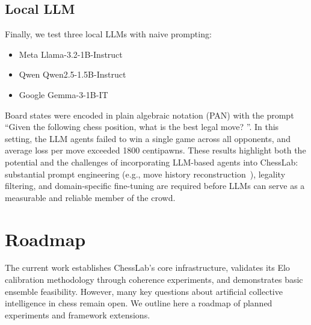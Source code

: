 \documentclass[sigconf]{aamas}
\begin{document}
\subsection{Local LLM}

Finally, we test three local LLMs with naive prompting:
\begin{itemize}
  \item Meta Llama-3.2-1B-Instruct
  \item Qwen Qwen2.5-1.5B-Instruct
  \item Google Gemma-3-1B-IT
\end{itemize}
Board states were encoded in plain algebraic notation (PAN) with the prompt ``Given the following chess position, what is the best legal move? ''.
In this setting, the LLM agents failed to win a single game across all opponents, and average loss per move exceeded 1800 centipawns.
These results highlight both the potential and the challenges of incorporating LLM-based agents into ChessLab: substantial prompt engineering (e.g., move history reconstruction~\cite{dynomight2024}), legality filtering, and domain-specific fine-tuning are required before LLMs can serve as a measurable and reliable member of the crowd.

\section{Roadmap}\label{sec:roadmap}

The current work establishes ChessLab's core infrastructure, validates its Elo calibration methodology through coherence experiments, and demonstrates basic ensemble feasibility.
However, many key questions about artificial collective intelligence in chess remain open.
We outline here a roadmap of planned experiments and framework extensions.
\end{document}
